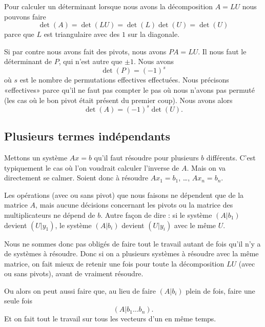 Pour calculer un déterminant lorsque nous avons la décomposition \( A=LU\) nous pouvons faire
\begin{equation}
    \det(A)=\det(LU)=\det(L)\det(U)=\det(U)
\end{equation}
parce que \( L\) est triangulaire avec des \( 1\) sur la diagonale.

Si par contre nous avons fait des pivots, nous avons \( PA=LU\). Il nous faut le déterminant de \( P\), qui n'est autre que \( \pm 1\). Nous avons
\begin{equation}
    \det(P)=(-1)^s
\end{equation}
où \( s\) est le nombre de permutations effectives effectuées. Nous précisons «effectives» parce qu'il ne faut pas compter le pas où nous n'avons pas permuté (les cas où le bon pivot était présent du premier coup). Nous avons alors
\begin{equation}
    \det(A)=(-1)^s\det(U).
\end{equation}

\subsection{Plusieurs termes indépendants}

Mettons un système \( Ax=b\) qu'il faut résoudre pour plusieurs \( b\) différents. C'est typiquement le cas où l'on voudrait calculer l'inverse de \( A\). Mais on va directement se calmer. Soient donc à résoudre \( Ax_1=b_1\), \ldots, \( Ax_n=b_n\).

Les opérations (avec ou sans pivot) que nous faisons ne dépendent que de la matrice \( A\), mais aucune décisions concernant les pivots ou la matrice des multiplicateurs ne dépend de \( b\). Autre façon de dire : si le système \(  (A|b_1)  \) devient \( (U|y_1)\), le système \( (A|b_i)\) devient \( (U|y_i)\) avec le même \( U\).

Nous ne sommes donc pas obligés de faire tout le travail autant de fois qu'il n'y a de systèmes à résoudre. Donc si on a plusieurs systèmes à résoudre avec la même matrice, on fait mieux de retenir une fois pour toute la décomposition \( LU\) (avec ou sans pivots), avant de vraiment résoudre.

Ou alors on peut aussi faire que, au lieu de faire \( (A|b_i)\) plein de fois, faire une seule fois
\begin{equation}
    (A|b_1\ldots b_n).
\end{equation}
Et on fait tout le travail sur tous les vecteurs d'un en même temps.

